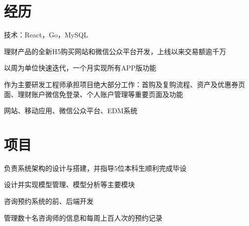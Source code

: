 \documentclass[]{resume_zh}
\begin{document}
\begin{minipage}[t]{0.69\textwidth} 


\section{经历}
\vspace{\topsep} %
\begin{tightemize}
\item 技术：React，Go，MySQL
\item 理财产品的全新H5购买网站和微信公众平台开发，上线以来交易额逾千万
\item 以周为单位快速迭代，一个月实现所有APP版功能
\item 作为主要研发工程师承担项目绝大部分工作：首购及复购流程、资产及优惠券页面、理财账户微信免登录、个人账户管理等重要页面及功能
\end{tightemize}

\begin{tightemize}
\item 网站、移动应用、微信公众平台、EDM系统
\end{tightemize}



\section{项目}
\begin{tightemize}
\item 负责系统架构的设计与搭建，并指导5位本科生顺利完成毕设
\item 设计并实现模型管理、模型分析等主要模块
\end{tightemize}


\begin{tightemize}
\item 咨询预约系统的前、后端开发
\item 管理数十名咨询师的信息和每周上百人次的预约记录
\end{tightemize}


\end{minipage}
\end{document}
